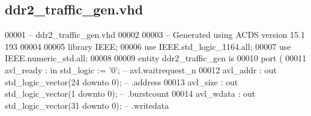 \subsection{ddr2\+\_\+traffic\+\_\+gen.\+vhd}
\label{ddr2__traffic__gen_8vhd_source}

\begin{DoxyCode}
00001 \textcolor{keyword}{-- ddr2\_traffic\_gen.vhd}
00002 
00003 \textcolor{keyword}{-- Generated using ACDS version 15.1 193}
00004 
00005 \textcolor{vhdlkeyword}{library }\textcolor{keywordflow}{IEEE};
00006 \textcolor{vhdlkeyword}{use }IEEE.std\_logic\_1164.\textcolor{keywordflow}{all};
00007 \textcolor{vhdlkeyword}{use }IEEE.numeric\_std.\textcolor{keywordflow}{all};
00008 
00009 \textcolor{keywordflow}{entity }ddr2\_traffic\_gen \textcolor{keywordflow}{is}
00010     \textcolor{keywordflow}{port} \textcolor{vhdlchar}{(}
00011         \textcolor{vhdlchar}{avl\_ready}           \textcolor{vhdlchar}{:} \textcolor{keywordflow}{in}  \textcolor{comment}{std\_logic}                     \textcolor{vhdlchar}{:=} \textcolor{vhdlchar}{'}\textcolor{vhdllogic}{}\textcolor{vhdllogic}{0}\textcolor{vhdlchar}{'};\textcolor{keyword}{             --      
       avl.waitrequest\_n}
00012         \textcolor{vhdlchar}{avl\_addr}            \textcolor{vhdlchar}{:} \textcolor{keywordflow}{out} \textcolor{comment}{std\_logic\_vector}\textcolor{vhdlchar}{(}\textcolor{vhdllogic}{}\textcolor{vhdllogic}{24} \textcolor{keywordflow}{downto} \textcolor{vhdllogic}{}\textcolor{vhdllogic}{0}\textcolor{vhdlchar}{)};\textcolor{keyword}{                    --          .address}
00013         \textcolor{vhdlchar}{avl\_size}            \textcolor{vhdlchar}{:} \textcolor{keywordflow}{out} \textcolor{comment}{std\_logic\_vector}\textcolor{vhdlchar}{(}\textcolor{vhdllogic}{}\textcolor{vhdllogic}{1} \textcolor{keywordflow}{downto} \textcolor{vhdllogic}{}\textcolor{vhdllogic}{0}\textcolor{vhdlchar}{)};\textcolor{keyword}{                     --          .burstcount}
00014         \textcolor{vhdlchar}{avl\_wdata}           \textcolor{vhdlchar}{:} \textcolor{keywordflow}{out} \textcolor{comment}{std\_logic\_vector}\textcolor{vhdlchar}{(}\textcolor{vhdllogic}{}\textcolor{vhdllogic}{31} \textcolor{keywordflow}{downto} \textcolor{vhdllogic}{}\textcolor{vhdllogic}{0}\textcolor{vhdlchar}{)};\textcolor{keyword}{                    --          .writedata}

\end{DoxyCode}
